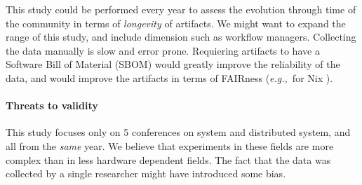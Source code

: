 \documentclass[sigconf,natbib=false]{acmart}
\newcommand{\eg}{\emph{e.g.,}}
\newcommand{\aeval}{Artifact Evaluation}
\newcommand{\todo}[1]{{\color{red}{TODO: #1}}}
\begin{document}
This study could be performed every year to assess the evolution through time of the community in terms of \emph{longevity} of artifacts.
We might want to expand the range of this study, and include dimension such as workflow managers.
Collecting the data manually is slow and error prone.
Requiering artifacts to have a Software Bill of Material (SBOM) \cite{sbom, xia2023empirical} would greatly improve the reliability of the data, and would improve the artifacts in terms of FAIRness (\eg\ for Nix \cite{genealogos}).

\paragraph{Threats to validity}

This study focuses only on 5 conferences on system and distributed system, and all from the \emph{same} year.
We believe that experiments in these fields are more complex than in less hardware dependent fields.
The fact that the data was collected by a single researcher might have introduced some bias.


% 
% 
% 
% 
\end{document}
